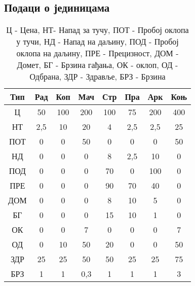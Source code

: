 \documentclass[11pt,a4paper]{report}
\begin{document}
\begin{table}[h]
\subsection{Подаци о јединицама}
\centering
\begin{tabular}{|| c || c | c | c | c | c | c | c ||}
\hline
Тип & Рад & Коп & Мач & Стр & Пра & Арк & Коњ \\
\hline\hline
Ц & 50 & 100 & 200 & 100 & 75 & 200 & 400\\
\hline
НТ & 2,5 & 10 & 20 & 4 & 2,5 & 2,5 & 25\\
\hline
ПОТ & 0 & 0 & 50 & 0 & 0 & 0 & 50\\
\hline
НД & 0 & 0 & 0 & 8 & 2,5 & 10 & 0\\
\hline
ПОД & 0 & 0 & 0 & 70 & 0 & 100 & 0\\
\hline
ПРЕ & 0 & 0 & 0 & 90 & 70 & 40 & 0\\
\hline
ДОМ & 0 & 0 & 0 & 8 & 10 & 5 & 0\\
\hline
БГ & 0 & 0 & 0 & 15 & 10 & 1 & 0\\
\hline
ОК & 0 & 0 & 7 & 0 & 0 & 0 & 7\\
\hline
ОД & 0 & 10 & 50 & 20 & 0 & 0 & 50\\
\hline
ЗДР & 25 & 25 & 50 & 50 & 25 & 25 & 75\\
\hline
БРЗ & 1 & 1 & 0,3 & 1 & 1 & 1 & 3 \\
\hline

\end{tabular}
\caption{Ц - Цена, НТ- Напад за тучу, ПОТ - Пробој оклопа у тучи, НД - Напад на даљину, ПОД - Пробој оклопа на даљину, ПРЕ - Прецизност, ДОМ - Домет, БГ - Брзина гађања, ОК - оклоп, ОД - Одбрана, ЗДР - Здравље, БРЗ - Брзина }
\end{table}
\FloatBarrier
\end{document}
